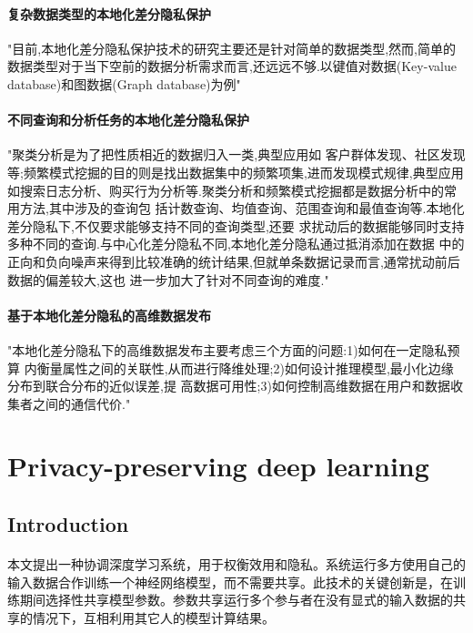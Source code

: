 \documentclass[12pt,a4paper]{article}
\begin{document}
\paragraph{复杂数据类型的本地化差分隐私保护} "目前,本地化差分隐私保护技术的研究主要还是针对简单的数据类型,然而,简单的数据类型对于当下空前的数据分析需求而言,还远远不够.以键值对数据(Key-value database)和图数据(Graph database)为例"
\paragraph{不同查询和分析任务的本地化差分隐私保护} "聚类分析是为了把性质相近的数据归入一类,典型应用如 客户群体发现、社区发现等;频繁模式挖掘的目的则是找出数据集中的频繁项集,进而发现模式规律,典型应用 如搜索日志分析、购买行为分析等.聚类分析和频繁模式挖掘都是数据分析中的常用方法,其中涉及的查询包 括计数查询、均值查询、范围查询和最值查询等.本地化差分隐私下,不仅要求能够支持不同的查询类型,还要 求扰动后的数据能够同时支持多种不同的查询.与中心化差分隐私不同,本地化差分隐私通过抵消添加在数据 中的正向和负向噪声来得到比较准确的统计结果,但就单条数据记录而言,通常扰动前后数据的偏差较大,这也 进一步加大了针对不同查询的难度."
\paragraph{基于本地化差分隐私的高维数据发布} "本地化差分隐私下的高维数据发布主要考虑三个方面的问题:1)如何在一定隐私预算 内衡量属性之间的关联性,从而进行降维处理;2)如何设计推理模型,最小化边缘分布到联合分布的近似误差,提 高数据可用性;3)如何控制高维数据在用户和数据收集者之间的通信代价."







\newpage
\section{Privacy-preserving deep learning\cite{shokri2015ppdl}}
\subsection{Introduction}
\paragraph{} 本文提出一种协调深度学习系统，用于权衡效用和隐私。系统运行多方使用自己的输入数据合作训练一个神经网络模型，而不需要共享。此技术的关键创新是，在训练期间选择性共享模型参数。参数共享运行多个参与者在没有显式的输入数据的共享的情况下，互相利用其它人的模型计算结果。
\end{document}
